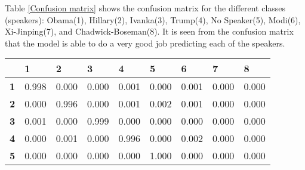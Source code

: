 \documentclass[10pt,twocolumn,letterpaper]{article}
\begin{document}
Table \ref{Confusion matrix} shows the confusion matrix for the different classes (speakers): Obama(1), Hillary(2), Ivanka(3), Trump(4), No Speaker(5), Modi(6), Xi-Jinping(7), and Chadwick-Boseman(8). It is seen from the confusion matrix that the model is able to do a very good job predicting each of the speakers.



\begin{table}[h]
    \begin{tabular}{l|l|l|l|l|l|l|l|l|}
    \cline{2-9}
                                     & \textbf{1}                    & \textbf{2}                    & \textbf{3}                    & \textbf{4}                    & 5                             & \textbf{6}                    & \textbf{7}                    & \textbf{8}                    \\ \hline
    \multicolumn{1}{|l|}{\textbf{1}} & \cellcolor[HTML]{67FD9A}0.998 & 0.000                         & 0.000                         & 0.001                         & 0.000                         & 0.001                         & 0.000                         & 0.000                         \\ \hline
    \multicolumn{1}{|l|}{\textbf{2}} & 0.000                         & \cellcolor[HTML]{67FD9A}0.996 & 0.000                         & 0.001                         & 0.002                         & 0.001                         & 0.000                         & 0.000                         \\ \hline
    \multicolumn{1}{|l|}{\textbf{3}} & 0.001                         & 0.000                         & \cellcolor[HTML]{67FD9A}0.999 & 0.000                         & 0.000                         & 0.000                         & 0.000                         & 0.000                         \\ \hline
    \multicolumn{1}{|l|}{\textbf{4}} & 0.000                         & 0.001                         & 0.000                         & \cellcolor[HTML]{67FD9A}0.996 & 0.000                         & 0.002                         & 0.000                         & 0.000                         \\ \hline
    \multicolumn{1}{|l|}{\textbf{5}} & 0.000                         & 0.000                         & 0.000                         & 0.000                         & \cellcolor[HTML]{67FD9A}1.000 & 0.000                         & 0.000                         & 0.000                         \\ \hline

\end{tabular}
\end{table}
\end{document}

